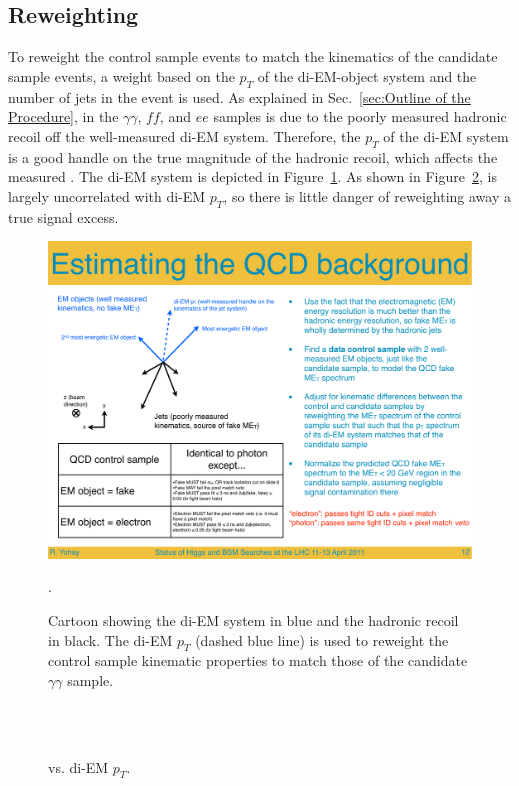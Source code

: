 \documentclass[dissertation.tex]{subfiles}
\begin{document}
\subsection{Reweighting}
\label{sec:Reweighting}

To reweight the control sample events to match the kinematics of the candidate sample events, a weight based on the $p_{T}$ of the di-EM-object system and the number of jets in the event is used.  As explained in Sec.~\ref{sec:Outline of the Procedure}, \MET in the $\gamma\gamma$, $\mathit{ff}$, and $ee$ samples is due to the poorly measured hadronic recoil off the well-measured di-EM system.  Therefore, the $p_{T}$ of the di-EM system is a good handle on the true magnitude of the hadronic recoil, which affects the measured \MET.  The di-EM system is depicted in Figure~\ref{fig:di-EM_pT_cartoon}.  As shown in Figure~\ref{fig:MET_vs_di-EM_pT}, \MET is largely uncorrelated with di-EM $p_{T}$, so there is little danger of reweighting away a true signal excess.

\begin{figure}
	\centering
	\includegraphics[scale=0.5]{di-EM_pT_cartoon}
	\caption{Cartoon showing the di-EM system in blue and the hadronic recoil in black.  The di-EM $p_{T}$ (dashed blue line) is used to reweight the control sample kinematic properties to match those of the candidate $\gamma\gamma$ sample.}.
	\label{fig:di-EM_pT_cartoon}
\end{figure}

\begin{figure}
	\centering
	\\
	\\
	\caption{\MET vs. di-EM $p_{T}$.}
	\label{fig:MET_vs_di-EM_pT}
\end{figure}
\end{document}
